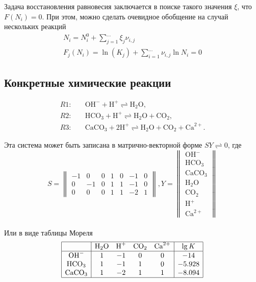 \documentclass[12pt,a4paper]{article}
\begin{document}
Задача восстановления равновесия заключается в поиске такого значения $\xi$, что $F(N_i) = 0$. При этом, можно сделать очевидное обобщение на случай нескольких реакций
\begin{gather*}
N_i = N_i^0 + \sum_{j=1}^{...} \xi_j\nu_{i,j}\\
F_j(N_i)=\ln(K_j) + \sum_{i=1}^{...} \nu_{i,j}\ln{N_i} = 0
\end{gather*}
 
\subsection{Конкретные химические реакции}

\newcommand{\OHm}{\text{OH}^-}
\newcommand{\Hp}{\text{H}^+}
\newcommand{\WAT}{\text{H}_2\text{O}}
\newcommand{\CARB}{\text{CO}_2}
\newcommand{\Catwop}{\text{Ca}^{2+}}
\newcommand{\Calcite}{\text{CaCO}_3}
\newcommand{\HCO}{\text{HCO}_3}

\begin{align*}
R1:&\quad \OHm + \Hp \rightleftharpoons \WAT,\\
R2:&\quad \HCO +\Hp \rightleftharpoons \WAT + \CARB,\\
R3:&\quad \Calcite + 2\Hp \rightleftharpoons \WAT + \CARB + \Catwop.
\end{align*}

Эта  система может быть записана в матрично-векторной форме $SY \rightleftharpoons 0$, где
$$S =  \begin{Vmatrix}
-1 &0 &0  &1 &0 &-1 &0\\
0 &-1 &0  &1 &1 &-1 &0\\
0  &0 &0  &1 &1 &-2 &1
		\end{Vmatrix},
  Y = \begin{Vmatrix}
  \OHm\\
  \HCO\\
  \Calcite\\
  \WAT\\
  \CARB\\
  \Hp\\
  \Catwop
  \end{Vmatrix}$$\\
Или в виде таблицы Мореля\\
$$\begin{array}{|c|cccc|c|}
\hline
		&\WAT	&\Hp	&\CARB	&\Catwop	&\lg {K}\\
\hline
\OHm		&1		&-1		&0		  &0		&-14\\
\HCO	&1		&-1		&1		  &0		&-5.928\\
\Calcite		&1		&-2		&1		  &1		&-8.094\\
\hline
\end{array}$$
\end{document}
